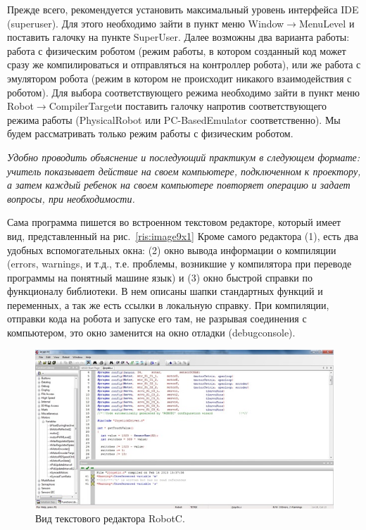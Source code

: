 Прежде всего, рекомендуется установить максимальный уровень интерфейса IDE (superuser). Для этого необходимо зайти в пункт меню Window\(\to\)MenuLevel и поставить галочку на пункте SuperUser. Далее возможны два варианта работы: работа с физическим роботом (режим работы, в котором созданный код может сразу же компилироваться и отправляться на контроллер робота), или же работа с эмулятором робота (режим в котором не происходит никакого взаимодействия с роботом). Для выбора соответствующего режима необходимо зайти в пункт меню Robot\(\to\)CompilerTargetи поставить галочку напротив соответствующего режима работы (PhysicalRobot или PC-BasedEmulator соответственно). Мы будем рассматривать только режим работы с физическим роботом.

{\slshape Удобно проводить объяснение и последующий практикум в следующем формате: учитель показывает действие на своем компьютере, подключенном к проектору, а затем каждый ребенок на своем компьютере повторяет операцию и задает вопросы, при необходимости.}

Сама программа пишется во встроенном текстовом редакторе, который имеет вид, представленный на рис.~\ref{ris:image9x1} Кроме самого редактора (1), есть два удобных вспомогательных окна: (2) окно вывода информации о компиляции (errors, warnings, и т.д., т.е. проблемы, возникшие у компилятора при переводе программы на понятный машине язык)  и (3)  окно быстрой справки по функционалу библиотеки. В нем описаны шапки стандартных функций и переменных, а так же есть ссылки в локальную справку. При компиляции, отправки кода на робота и запуске его там, не разрывая соединения с компьютером, это окно заменится на окно отладки (debugconsole).

\begin{figure}[h!]
	\begin{center}
		\includegraphics[width=0.93\linewidth]{chapters/chapter9/images/2}
		\caption{Вид текстового редактора RobotC.}
		\label{ris:image9x2}
	\end{center}
\end{figure}

